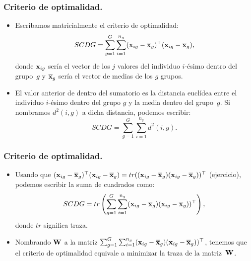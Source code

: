\begin{frame}
\frametitle{Criterio de optimalidad.}
\begin{itemize}
\item<2->{Escribamos matricialmente el criterio de optimalidad:
$$
SCDG = \sum_{g=1}^G\sum_{i=1}^{n_g} (\mathbf{x}_{ig}-\overline{\mathbf{x}}_g)^\top (\mathbf{x}_{ig}-\overline{\mathbf{x}}_g),
$$
donde $\mathbf{x}_{ig}$ sería el vector de los $j$ valores del individuo $i$-ésimo dentro del grupo~$g$ y $\overline{\mathbf{x}}_g$ sería el vector de medias de los $g$ grupos.}
\item<3->{El valor anterior de dentro del sumatorio es la distancia euclídea entre el individuo $i$-ésimo dentro del grupo $g$ y la media dentro del grupo~$g$. Si nombramos $d^2(i,g)$ a dicha distancia, podemos escribir: $$SCDG=\sum_{g=1}^G\sum_{i=1}^{n_g} d^2(i,g).$$}
\end{itemize}
\end{frame}
\begin{frame}
\frametitle{Criterio de optimalidad.}
\begin{itemize}
\item<2->{Usando que $ (\mathbf{x}_{ig}-\overline{\mathbf{x}}_g)^\top (\mathbf{x}_{ig}-\overline{\mathbf{x}}_g) =tr( (\mathbf{x}_{ig}-\overline{\mathbf{x}}_g) (\mathbf{x}_{ig}-\overline{\mathbf{x}}_g))^\top$ (ejercicio), podemos escribir la suma de cuadrados como:
$$
SCDG=tr\left( \sum_{g=1}^G\sum_{i=1}^{n_g} (\mathbf{x}_{ig}-\overline{\mathbf{x}}_g) (\mathbf{x}_{ig}-\overline{\mathbf{x}}_g))^\top \right),
$$
donde $tr$ significa traza.}
\item<3->{Nombrando $\mathbf{W}$ a la matriz $ \sum_{g=1}^G\sum_{i=1}^{n_g} (\mathbf{x}_{ig}-\overline{\mathbf{x}}_g) (\mathbf{x}_{ig}-\overline{\mathbf{x}}_g))^\top$, tenemos que el criterio de optimalidad equivale a minimizar la traza de la matriz~$\mathbf{W}$.}
\end{itemize}
\end{frame}

